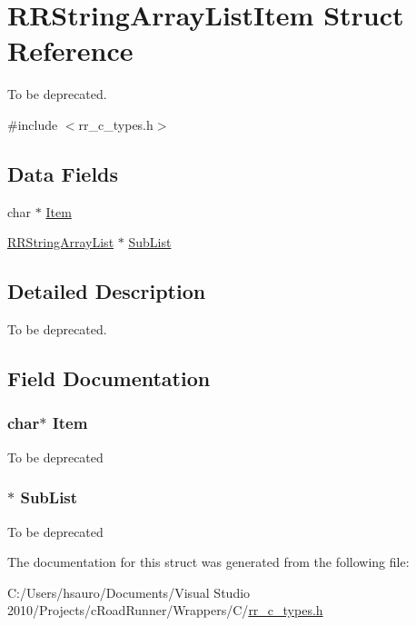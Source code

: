 \hypertarget{struct_r_r_string_array_list_item}{
\section{\-R\-R\-String\-Array\-List\-Item \-Struct \-Reference}
\label{struct_r_r_string_array_list_item}
}


\-To be deprecated.  




{\ttfamily \#include $<$rr\-\_\-c\-\_\-types.\-h$>$}

\subsection*{\-Data \-Fields}
\begin{DoxyCompactItemize}
\item 
char $\ast$ \hyperlink{struct_r_r_string_array_list_item_a244b3f4d5a24f0cae10de599fe62c889}{\-Item}
\item 
\hyperlink{struct_r_r_string_array_list}{\-R\-R\-String\-Array\-List} $\ast$ \hyperlink{struct_r_r_string_array_list_item_a933c5818b994da50f225a40b967fb661}{\-Sub\-List}
\end{DoxyCompactItemize}


\subsection{\-Detailed \-Description}
\-To be deprecated. 

\subsection{\-Field \-Documentation}
\hypertarget{struct_r_r_string_array_list_item_a244b3f4d5a24f0cae10de599fe62c889}{
\subsubsection[{\-Item}]{\setlength{\rightskip}{0pt plus 5cm}char$\ast$ {\bf \-Item}}}
\label{struct_r_r_string_array_list_item_a244b3f4d5a24f0cae10de599fe62c889}
\-To be deprecated \hypertarget{struct_r_r_string_array_list_item_a933c5818b994da50f225a40b967fb661}{
\subsubsection[{\-Sub\-List}]{$\ast$ {\bf \-Sub\-List}}}
\label{struct_r_r_string_array_list_item_a933c5818b994da50f225a40b967fb661}
\-To be deprecated 

\-The documentation for this struct was generated from the following file\-:\begin{DoxyCompactItemize}
\item 
\-C\-:/\-Users/hsauro/\-Documents/\-Visual Studio 2010/\-Projects/c\-Road\-Runner/\-Wrappers/\-C/\hyperlink{rr__c__types_8h}{rr\-\_\-c\-\_\-types.\-h}\end{DoxyCompactItemize}
